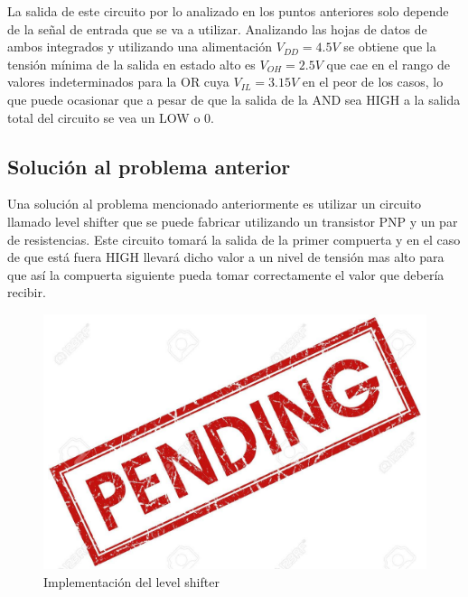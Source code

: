 \documentclass[a4paper]{article}
\begin{document}
La salida de este circuito por lo analizado en los puntos anteriores solo depende de la señal de entrada que se va a utilizar. Analizando las hojas de datos de ambos integrados y utilizando una alimentación $V_{DD}= 4.5V $ se obtiene que la tensión mínima de la salida en estado alto es $V_{OH}=2.5 V$ que cae en el rango de valores indeterminados para la OR cuya $V_{IL}= 3.15 V$ en el peor de los casos, lo que puede ocasionar que a pesar de que la salida de la AND sea HIGH a la salida total del circuito se vea un LOW o 0.


\subsection{Solución al problema anterior}

Una solución al problema mencionado anteriormente es utilizar un circuito llamado level shifter que se puede fabricar utilizando un transistor PNP y un par de resistencias. Este circuito tomará la salida de la primer compuerta y en el caso de que está fuera HIGH llevará dicho valor a un nivel de tensión mas alto para que así la compuerta siguiente pueda tomar correctamente el valor que debería recibir.


\begin{figure}[h]
    \centering
    \includegraphics{Imagenes/pend.jpg}
    \caption{Implementación del level shifter}
\end{figure}
\end{document}
